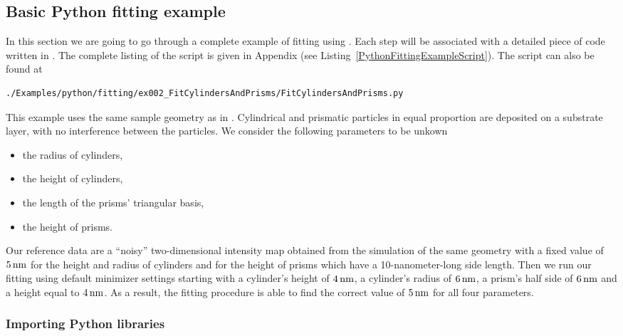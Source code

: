 \subsection{Basic Python fitting example} 

In this section we are going to go through a complete example of
fitting using \BornAgain. Each  step will be associated with a
detailed piece of code written in \Python. 
The complete listing of
the script is given in Appendix (see Listing~\ref{PythonFittingExampleScript}).
The script can also be found at
\begin{lstlisting}[language=shell, style=commandline]
./Examples/python/fitting/ex002_FitCylindersAndPrisms/FitCylindersAndPrisms.py
\end{lstlisting}

\noindent
This example uses the same sample geometry as in .
Cylindrical and
prismatic particles in equal proportion are deposited on a substrate layer, with no interference
between the particles. We consider the following parameters to be unkown
\begin{itemize}
\item the radius of cylinders,
\item the height of cylinders,
\item the length of the prisms' triangular basis,
\item the height of prisms.
\end{itemize}

Our reference data are a ``noisy'' two-dimensional intensity
map obtained from the simulation of the same geometry with a fixed
value of $5\,{\rm nm}$ for the height and radius of cylinders and for the
height of prisms which have a 10-nanometer-long side length. 
Then we run our fitting using default minimizer settings
starting with a cylinder's height
of $4\,{\rm nm}$, a cylinder's radius of $6\,{\rm nm}$, 
a prism's half side of $6\,{\rm nm}$ and a height equal to $4\,{\rm nm}$.
As a result, the fitting procedure is able to find the correct value of $5\,{\rm nm}$
for all four parameters.


\subsubsection*{Importing Python libraries}

